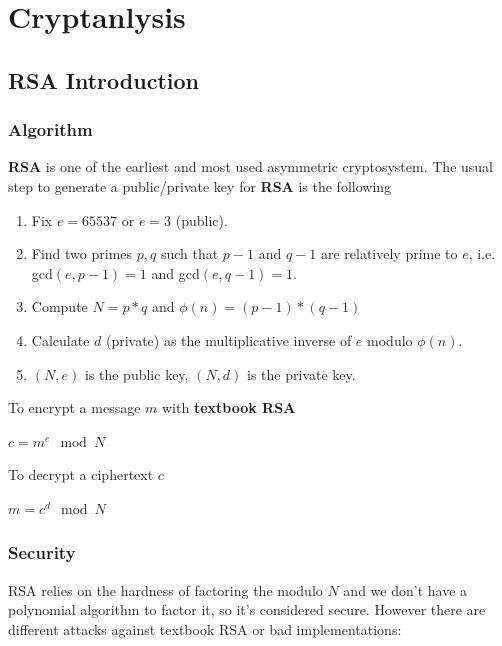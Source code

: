 \documentclass[a4paper,12pt]{report}
\begin{document}
\chapter{Cryptanlysis}


\section{RSA Introduction}

\subsection{Algorithm}

\textbf{RSA} is one of the earliest and most used asymmetric cryptosystem.
The usual step to generate a public/private key for \textbf{RSA} is the following

\begin{enumerate}
    \item Fix $e = 65537$ or $e = 3$ (public).
    \item Find two primes $p, q$ such that $p - 1$ and $q - 1$ are relatively prime to $e$, i.e. gcd$(e, p-1) = 1$ and gcd$(e, q-1) = 1$.
    \item Compute $N = p * q$ and $\phi(n) = (p-1) * (q-1)$
    \item Calculate $d$ (private) as the multiplicative inverse of $e$ modulo $\phi(n)$.
    \item $(N, e)$ is the public key, $(N, d)$ is the private key.
\end{enumerate}

To encrypt a message $m$ with \textbf{textbook RSA}

\begin{center}
    $c = m^e \mod N$
\end{center}

To decrypt a ciphertext $c$

\begin{center}
    $m = c^d \mod N$
\end{center}

\subsection{Security}

RSA relies on the hardness of factoring the modulo $N$ and we don't have a polynomial algorithm to factor it, so it's considered secure.
However there are different attacks against textbook RSA or bad implementations:
\end{document}
